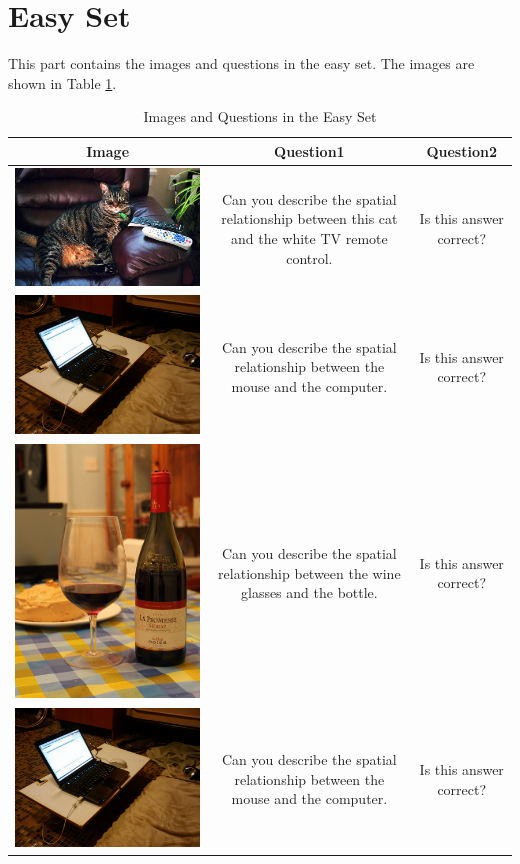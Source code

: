 \section{Easy Set}
This part contains the images and questions in the easy set. The images are shown in Table \ref{tab:easy}.
\begin{table}[htbp]
\centering
\caption{Images and Questions in the Easy Set}
\label{tab:easy}
\begin{tabular}{@{}ccc@{}}
    \hline
        Image & Question1 & Question2 \\ \hline
        \includegraphics[width=0.25\linewidth]{easy/000000000599.jpg}& Can you describe the spatial relationship between this cat and the white TV remote control.& Is this answer correct?\\ \hline
        \includegraphics[width=0.25\linewidth]{easy/000000004057.jpg} & Can you describe the spatial relationship between the mouse and the computer. & Is this answer correct? \\ \hline
        \includegraphics[width=0.25\linewidth]{easy/000000011742.jpg} & Can you describe the spatial relationship between the wine glasses and the bottle. & Is this answer correct? \\ \hline
        \includegraphics[width=0.25\linewidth]{easy/000000004057.jpg} & Can you describe the spatial relationship between the mouse and the computer. & Is this answer correct? \\ \hline
    \end{tabular}
\end{table}